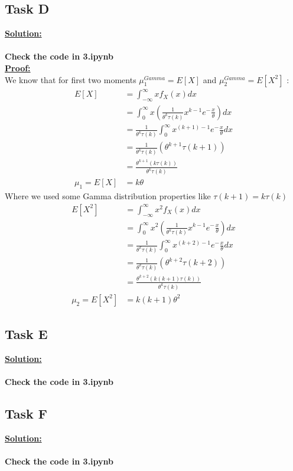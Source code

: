 \documentclass[12pt]{article}
\begin{document}
\subsection{Task D}
\textbf{\underline{Solution:}}\\
\\
\textbf{Check the code in 3.ipynb}
\\
\textbf{\underline{Proof: }}
\\
We know that for first two moments $\mu_1^{Gamma} = E[X]$ and $\mu_2^{Gamma} = E[X^2]$ :
\begin{equation}
\begin{split}
    E[X] &= \int_{-\infty}^{\infty}xf_X(x)dx\\
         &= \int_{0}^{\infty}x(\frac{1}{\theta^k\tau(k)}x^{k-1}e^-\frac{x}{\theta})dx\\
         &= \frac{1}{\theta^k\tau(k)}\int_{0}^{\infty}x^{(k+1)-1}e^-\frac{x}{\theta}dx\\ 
         &= \frac{1}{\theta^k\tau(k)}(\theta^{k+1}\tau(k+1))\\
          &= \frac{\theta^{k+1}(k\tau(k))}{\theta^k\tau(k)}\\
         \mu_1 = E[X] &= k\theta
\end{split}
\end{equation}
Where we used some Gamma distribution properties like $\tau(k+1) = k\tau(k)$
\begin{equation}
\begin{split}
    E[X^2] &= \int_{-\infty}^{\infty}x^2f_X(x)dx\\
         &= \int_{0}^{\infty}x^2(\frac{1}{\theta^k\tau(k)}x^{k-1}e^-\frac{x}{\theta})dx\\
         &= \frac{1}{\theta^k\tau(k)}\int_{0}^{\infty}x^{(k+2)-1}e^-\frac{x}{\theta}dx\\ 
         &= \frac{1}{\theta^k\tau(k)}(\theta^{k+2}\tau(k+2))\\
          &= \frac{\theta^{k+2}(k(k+1)\tau(k))}{\theta^k\tau(k)}\\
         \mu_2 = E[X^2] &= k(k+1)\theta^2
\end{split}
\end{equation}
\subsection{Task E}
\textbf{\underline{Solution:}}\\
\\
\textbf{Check the code in 3.ipynb}
\subsection{Task F}
\textbf{\underline{Solution:}}\\
\\
\textbf{Check the code in 3.ipynb}
\end{document}
